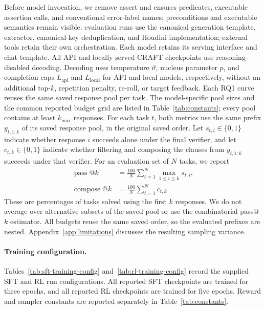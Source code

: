 Before model invocation, we remove assert and ensures
predicates, executable assertion calls, and conventional error-label names;
preconditions and
executable semantics remain visible.  \sam{} evaluation
runs use the canonical generation template, extractor, canonical-key deduplication,
and Houdini implementation; external tools retain their own orchestration.
Each model retains its serving interface and chat template.  All API and
locally served CRAFT checkpoints use reasoning-disabled decoding.
Decoding uses temperature \(\vartheta\), nucleus parameter \(p\), and
completion caps \(L_{\mathrm{api}}\) and \(L_{\mathrm{local}}\) for API and
local models, respectively, without an additional top-\(k\), repetition
penalty, re-roll, or target feedback.  Each RQ1 curve reuses the same saved
response pool per task.  The model-specific pool sizes and the common reported
budget grid are listed in Table~\ref{tab:constants}; every pool contains at
least \(k_{\max}\) responses.
For each task \(t\), both metrics use the same prefix
\(y_{t,1:k}\) of its saved response pool, in the original saved order.
Let \(s_{t,i}\in\{0,1\}\) indicate whether response \(i\) succeeds alone
under the final verifier, and let \(c_{t,k}\in\{0,1\}\) indicate whether
filtering and composing the clauses from \(y_{t,1:k}\) succeeds under that
verifier.  For an evaluation set of \(N\) tasks, we report
\[
\begin{aligned}
 \operatorname{pass}@k
   &= \frac{100}{N}\sum_{t=1}^{N}\max_{1\leq i\leq k}s_{t,i},\\
 \operatorname{compose}@k
   &= \frac{100}{N}\sum_{t=1}^{N}c_{t,k}.
\end{aligned}
\]
These are percentages of tasks solved using the first \(k\) responses.
We do not average over alternative subsets of the saved pool or use the
combinatorial pass@\(k\) estimator.  All budgets reuse the same saved order,
so the evaluated prefixes are nested.  Appendix~\ref{app:limitations}
discusses the resulting sampling variance.

\paragraph{Training configuration.}
Tables~\ref{tab:sft-training-config} and~\ref{tab:rl-training-config}
record the supplied SFT and RL run configurations.  All reported SFT
checkpoints are trained for three epochs, and all reported RL checkpoints are
trained for five epochs.  Reward and sampler constants are reported separately
in Table~\ref{tab:constants}.


